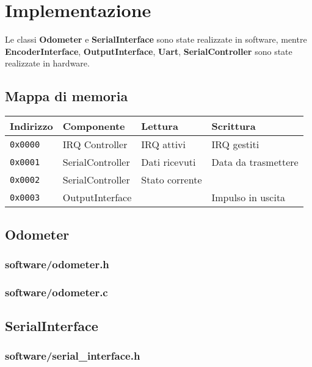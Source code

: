 \documentclass [11pt,a4paper,oneside]{article}
\begin{document}
\section{Implementazione}

Le classi \textbf{Odometer} e \textbf{SerialInterface} sono state
realizzate in software, mentre \textbf{EncoderInterface}, 
\textbf{OutputInterface}, \textbf{Uart}, \textbf{SerialController}
sono state realizzate in hardware.

\subsection{Mappa di memoria}
\begin{tabular}{|l|l|l|l|}
\hline
Indirizzo & Componente & Lettura & Scrittura \\
\hline
\texttt{0x0000} & IRQ Controller & IRQ attivi & IRQ gestiti \\
\hline
\texttt{0x0001} & SerialController & Dati ricevuti & Data da trasmettere \\
\hline
\texttt{0x0002} & SerialController & Stato corrente & \\
\hline
\texttt{0x0003} & OutputInterface & & Impulso in uscita \\
\hline
\end{tabular}



\subsection{Odometer}
\subsubsection{software/odometer.h}

\subsubsection{software/odometer.c}


\subsection{SerialInterface}
\subsubsection{software/serial\_interface.h}

\end{document}
